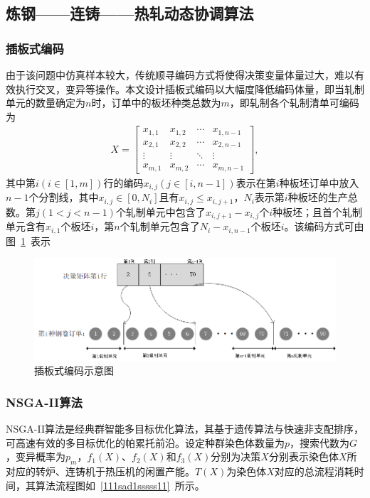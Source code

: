 \documentclass{whutmod}
\begin{document}
		\subsection{炼钢——连铸——热轧动态协调算法}
		\subsubsection{插板式编码}
	    由于该问题中仿真样本较大，传统顺寻编码方式将使得决策变量体量过大，难以有效执行交叉，变异等操作。本文设计插板式编码以大幅度降低编码体量，即当轧制单元的数量确定为$n$时，订单中的板坯种类总数为$m$，即轧制各个轧制清单可编码为
	    \begin{gather*}
	   X= \begin{bmatrix}
	   x_{1,1} & x_{1,2} &\cdots   & x_{1,n-1}\\ 
	   x_{2,1} & x_{2,2} &\cdots   & x_{2,n-1}\\ 
	   \vdots  & \vdots  & \ddots  & \vdots \\ 
	   x_{m,1} & x_{m,2} &\cdots   & x_{m,n-1}
	   \end{bmatrix},
	    \end{gather*}
		其中第$i(i\in[1,m])$行的编码$x_{i,j}(j\in[i,n-1])$表示在第$i$种板坯订单中放入$n-1$个分割线，其中$x_{i,j}\in[0,N_i]$且有$x_{i,j}\leqslant x_{i,j+1}$，$N_i$表示第$i$种板坯的生产总数。第$j(1<j<n-1)$个轧制单元中包含了$x_{i,j+1}-x_{i,j}$个$i$种板坯；且首个轧制单元含有$x_{i,1}$个板坯$i$，第$n$个轧制单元包含了$N_i-x_{i,n-1}$个板坯$i$。该编码方式可由图~\ref{lssssabel}~表示
	\begin{figure}[H]
			\centering
			\includegraphics[width=\textwidth]{figures/bianma.png}
			\caption{插板式编码示意图}\label{lssssabel}
		\end{figure}
		
		
		\subsubsection{NSGA-II算法}
		NSGA-II算法是经典群智能多目标优化算法，其基于遗传算法与快速非支配排序，可高速有效的多目标优化的帕累托前沿。设定种群染色体数量为$p$，搜索代数为$G$，变异概率为$p_m$，$f_1(X)$、$f_2(X)$和$f_3(X)$分别为决策$X$分别表示染色体$X$所对应的转炉、连铸机于热压机的闲置产能。$T(X)$为染色体$X$对应的总流程消耗时间，其算法流程图如~\ref{111sad1sssss11}~所示。
		
\end{document}
